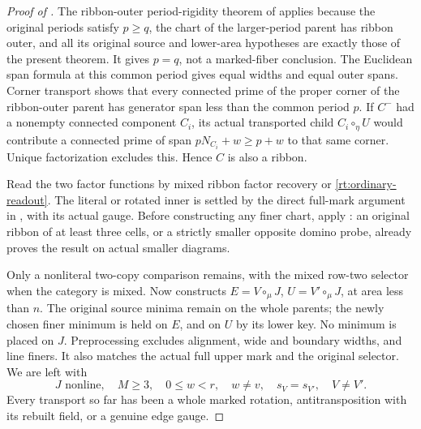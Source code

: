 \documentclass[11pt,a4paper]{amsart}
\numberwithin{equation}{section}
\theoremstyle{plain}
\theoremstyle{definition}
\begin{document}
\begin{proof}[Proof of ]
The ribbon-outer period-rigidity theorem of \cite{Shields2026RibbonPeriod}
applies because the original periods satisfy \(p\ge q\), the chart
of the larger-period parent has ribbon outer, and all its original
source and lower-area hypotheses are exactly those of the present theorem.
It gives \(p=q\), not a marked-fiber conclusion.
The Euclidean span formula at this common period gives equal widths
and equal outer spans.  Corner transport
\cite[Corner transport theorem]{Shields2026CornerDescent} shows that
every connected prime of the proper corner of the ribbon-outer parent
has generator span less than the common period \(p\).  If \(C^-\)
had a nonempty connected component \(C_i\), its actual transported
child \(C_i\circ_\eta U\) would contribute a connected prime of span
\(pN_{C_i}+w\ge p+w\) to that same corner.  Unique factorization
excludes this.  Hence \(C\) is also a ribbon.

Read the two factor functions by mixed ribbon factor recovery
\cite{Shields2026Readout} or \eqref{rt:ordinary-readout}.  The literal or rotated inner is settled
by the direct full-mark argument in , with its
actual gauge.  Before constructing any finer chart, apply
: an original ribbon of at least three cells,
or a strictly smaller opposite domino probe, already proves the
result on actual smaller diagrams.

Only a nonliteral two-copy comparison remains, with the mixed
row-two selector when the category is mixed.
Now  constructs
\(E=V\circ_\mu J\), \(U=V'\circ_\mu J\), at area less than \(n\).
The original source minima remain on the whole parents; the newly
chosen finer minimum is held on \(E\), and on \(U\) by its lower
key.  No minimum is placed on \(J\).
Preprocessing  excludes alignment, wide and
boundary widths, and line finers.  It also matches the actual full
upper mark and the original selector.  We are left with
\[
 J\text{ nonline},\quad M\ge3,\quad
 0\le w<r,\quad w\ne v,
 \quad s_V=s_{V'},\quad V\ne V'.
\]
Every transport so far has been a whole marked rotation,
antitransposition with its rebuilt field, or a genuine edge gauge.


\end{proof}
\end{document}

